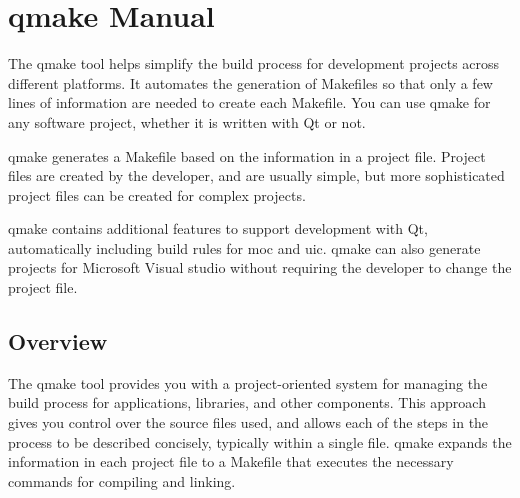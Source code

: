 \chapter{qmake Manual}
The qmake tool helps simplify the build process for development projects across different platforms.%
It automates the generation of Makefiles so that only a few lines of information are needed to create each Makefile.%
You can use qmake for any software project, whether it is written with Qt or not.%
\par
qmake generates a Makefile based on the information in a project file. Project files are created by the developer, and are usually simple, but more sophisticated project files can be created for complex projects.
\par
qmake contains additional features to support development with Qt, automatically including build rules for moc and uic.%
qmake can also generate projects for Microsoft Visual studio without requiring the developer to change the project file.

\section{Overview}
The qmake tool provides you with a project-oriented system for managing the build process for applications, libraries, and other components. This approach gives you control over the source files used, and allows each of the steps in the process to be described concisely, typically within a single file. qmake expands the information in each project file to a Makefile that executes the necessary commands for compiling and linking.

